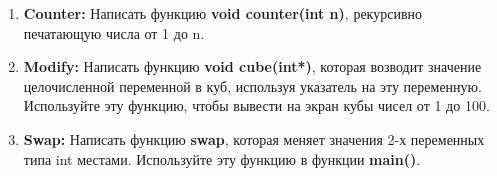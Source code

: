 \documentclass{article}
\begin{document}
\begin{enumerate}
\item \textbf{Counter:} Написать функцию \textbf{void counter(int n)}, рекурсивно печатающую числа от 1 до n.
\item \textbf{Modify:} Написать функцию \textbf{void cube(int*)}, которая возводит значение целочисленной переменной в куб, используя указатель на эту переменную. Используйте эту функцию, чтобы вывести на экран кубы чисел от 1 до 100.
\item \textbf{Swap:} Написать функцию \textbf{swap}, которая меняет значения 2-х переменных типа int местами. Используйте эту функцию в функции \textbf{main()}.



\end{enumerate}
\end{document}
